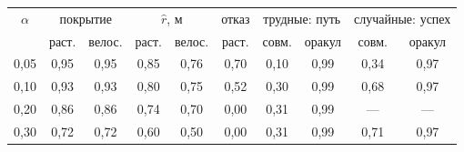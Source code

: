 \begin{tabular}{c|cc|cc|c|cc|cc}
\toprule
$\alpha$ & \multicolumn{2}{c|}{покрытие} & \multicolumn{2}{c|}{$\hat r$, м} & отказ & \multicolumn{2}{c|}{трудные: путь} & \multicolumn{2}{c}{случайные: успех} \\
 & раст. & велос. & раст. & велос. & раст. & совм. & оракул & совм. & оракул \\
\midrule
0{,}05 & 0{,}95 & 0{,}95 & 0{,}85 & 0{,}76 & 0{,}70 & 0{,}10 & 0{,}99 & 0{,}34 & 0{,}97 \\
0{,}10 & 0{,}93 & 0{,}93 & 0{,}80 & 0{,}75 & 0{,}52 & 0{,}30 & 0{,}99 & 0{,}68 & 0{,}97 \\
0{,}20 & 0{,}86 & 0{,}86 & 0{,}74 & 0{,}70 & 0{,}00 & 0{,}31 & 0{,}99 & --- & --- \\
0{,}30 & 0{,}72 & 0{,}72 & 0{,}60 & 0{,}50 & 0{,}00 & 0{,}31 & 0{,}99 & 0{,}71 & 0{,}97 \\
\bottomrule
\end{tabular}
